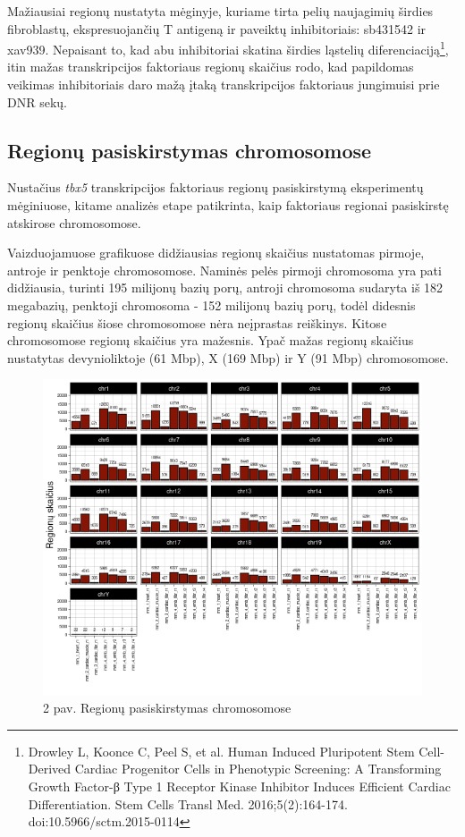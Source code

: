 \documentclass[12pt]{article}
\begin{document}
Mažiausiai regionų nustatyta mėginyje, kuriame tirta pelių
naujagimių širdies fibroblastų, ekspresuojančių T antigeną
ir paveiktų inhibitoriais: sb431542 ir xav939.
Nepaisant to, kad abu inhibitoriai skatina širdies ląstelių
diferenciaciją\footnote{Drowley L, Koonce C, Peel S, et al.
Human Induced Pluripotent Stem Cell-Derived Cardiac Progenitor
Cells in Phenotypic Screening: A Transforming Growth Factor-β
Type 1 Receptor Kinase Inhibitor Induces Efficient Cardiac
Differentiation. Stem Cells Transl Med. 2016;5(2):164-174.
doi:10.5966/sctm.2015-0114}, itin mažas transkripcijos
faktoriaus regionų skaičius rodo, kad papildomas veikimas
inhibitoriais daro mažą įtaką transkripcijos faktoriaus
jungimuisi prie DNR sekų.

\newpage

\subsection{Regionų pasiskirstymas chromosomose}
Nustačius \emph{tbx5} transkripcijos faktoriaus regionų
pasiskirstymą eksperimentų mėginiuose, kitame analizės etape
patikrinta, kaip faktoriaus regionai pasiskirstę atskirose
chromosomose.

Vaizduojamuose grafikuose didžiausias regionų skaičius nustatomas
pirmoje, antroje ir penktoje chromosomose. Naminės pelės pirmoji
chromosoma yra pati didžiausia, turinti 195 milijonų bazių porų,
antroji chromosoma sudaryta iš 182 megabazių, penktoji chromosoma -
152 milijonų bazių porų, todėl didesnis regionų skaičius šiose
chromosomose nėra neįprastas reiškinys. Kitose chromosomose regionų
skaičius yra mažesnis. Ypač mažas regionų skaičius nustatytas
devynioliktoje (61 Mbp), X (169 Mbp) ir Y (91 Mbp) chromosomose.

\begin{figure}[htb]
    \begin{center}
        \includegraphics[width=0.8\linewidth]{Figures/peak_counts_by_chromosome.png}
        \caption*{2 pav. Regionų pasiskirstymas chromosomose}
    \end{center}
\end{figure}
\end{document}
